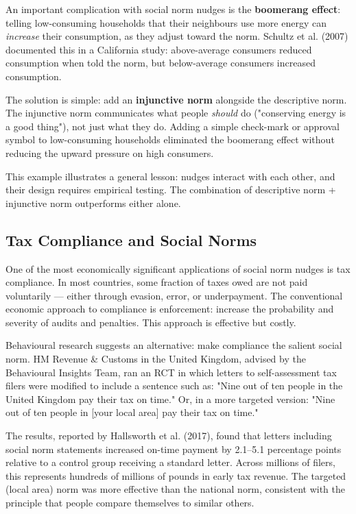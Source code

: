\documentclass[12pt, letterpaper]{article}
\begin{document}
An important complication with social norm nudges is the \textbf{boomerang effect}: telling low-consuming households that their neighbours use more energy can \textit{increase} their consumption, as they adjust toward the norm. Schultz et al. (2007) documented this in a California study: above-average consumers reduced consumption when told the norm, but below-average consumers increased consumption.

The solution is simple: add an \textbf{injunctive norm} alongside the descriptive norm. The injunctive norm communicates what people \textit{should} do ("conserving energy is a good thing"), not just what they do. Adding a simple check-mark or approval symbol to low-consuming households eliminated the boomerang effect without reducing the upward pressure on high consumers.

This example illustrates a general lesson: nudges interact with each other, and their design requires empirical testing. The combination of descriptive norm + injunctive norm outperforms either alone.


\subsection{Tax Compliance and Social Norms}


One of the most economically significant applications of social norm nudges is tax compliance. In most countries, some fraction of taxes owed are not paid voluntarily --- either through evasion, error, or underpayment. The conventional economic approach to compliance is enforcement: increase the probability and severity of audits and penalties. This approach is effective but costly.

Behavioural research suggests an alternative: make compliance the salient social norm. HM Revenue \& Customs in the United Kingdom, advised by the Behavioural Insights Team, ran an RCT in which letters to self-assessment tax filers were modified to include a sentence such as: "Nine out of ten people in the United Kingdom pay their tax on time." Or, in a more targeted version: "Nine out of ten people in [your local area] pay their tax on time."

The results, reported by Hallsworth et al. (2017), found that letters including social norm statements increased on-time payment by 2.1--5.1 percentage points relative to a control group receiving a standard letter. Across millions of filers, this represents hundreds of millions of pounds in early tax revenue. The targeted (local area) norm was more effective than the national norm, consistent with the principle that people compare themselves to similar others.
\end{document}
